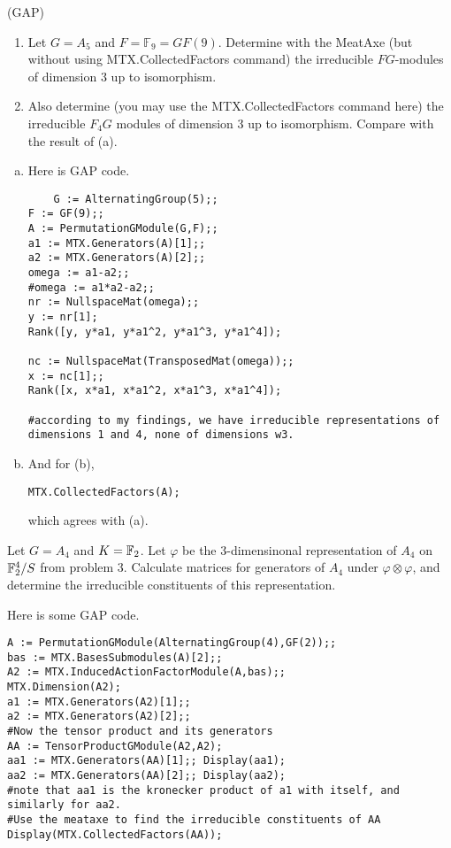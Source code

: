 \documentclass[leqno]{article}
\begin{document}
\newpage
\begin{problem}
(\textsf{GAP}) 
\begin{enumerate}
    \item Let $G=A_5$ and $F=\mathbb{F}_9=GF(9)$. Determine with the MeatAxe (but without using \textsf{MTX.CollectedFactors} command) the irreducible $FG$-modules of dimension 3 up to isomorphism. 
    \item Also determine (you may use the \textsf{MTX.CollectedFactors} command here) the irreducible $F_4G$ modules of dimension 3 up to isomorphism. Compare with the result of (a).
\end{enumerate}
\end{problem}
\begin{solution}
\begin{enumerate}[(a)]
    \item Here is \textsf{GAP} code.
    \begin{verbatim}
    G := AlternatingGroup(5);;
F := GF(9);;
A := PermutationGModule(G,F);;
a1 := MTX.Generators(A)[1];;
a2 := MTX.Generators(A)[2];;
omega := a1-a2;;
#omega := a1*a2-a2;;
nr := NullspaceMat(omega);;
y := nr[1];
Rank([y, y*a1, y*a1^2, y*a1^3, y*a1^4]);

nc := NullspaceMat(TransposedMat(omega));;
x := nc[1];;
Rank([x, x*a1, x*a1^2, x*a1^3, x*a1^4]);

#according to my findings, we have irreducible representations of dimensions 1 and 4, none of dimensions w3.
\end{verbatim}

\item And for (b),
\begin{verbatim}
MTX.CollectedFactors(A);
\end{verbatim}
which agrees with (a).
\end{enumerate}
\end{solution}


\newpage
\begin{problem}
Let $G=A_4$ and $K=\mathbb{F}_2$. Let $\varphi$ be the 3-dimensinonal representation of $A_4$ on $\mathbb{F}_2^4/S$ from problem 3. Calculate matrices for generators of $A_4$ under $\varphi \otimes \varphi$, and determine the irreducible constituents of this representation.
\end{problem}
\begin{solution}
Here is some \textsf{GAP} code.
\begin{verbatim}
A := PermutationGModule(AlternatingGroup(4),GF(2));;
bas := MTX.BasesSubmodules(A)[2];;
A2 := MTX.InducedActionFactorModule(A,bas);; 
MTX.Dimension(A2);
a1 := MTX.Generators(A2)[1];;
a2 := MTX.Generators(A2)[2];;
#Now the tensor product and its generators
AA := TensorProductGModule(A2,A2);
aa1 := MTX.Generators(AA)[1];; Display(aa1);
aa2 := MTX.Generators(AA)[2];; Display(aa2);
#note that aa1 is the kronecker product of a1 with itself, and similarly for aa2.
#Use the meataxe to find the irreducible constituents of AA
Display(MTX.CollectedFactors(AA));
\end{verbatim}
\end{solution}
\end{document}
